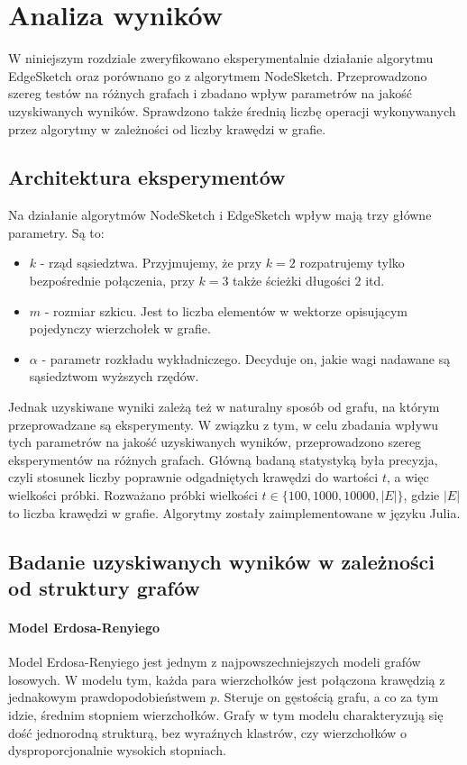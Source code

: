 \chapter{Analiza wyników}

    W niniejszym rozdziale zweryfikowano eksperymentalnie działanie algorytmu EdgeSketch oraz porównano go z algorytmem NodeSketch. Przeprowadzono szereg testów na różnych grafach i zbadano wpływ parametrów na jakość uzyskiwanych wyników. Sprawdzono także średnią liczbę operacji wykonywanych przez algorytmy w zależności od liczby krawędzi w grafie.

\section{Architektura eksperymentów}

    Na działanie algorytmów NodeSketch i EdgeSketch wpływ mają trzy główne parametry. Są to:
    \begin{itemize}
        \item $k$ - rząd sąsiedztwa. Przyjmujemy, że przy $k = 2$ rozpatrujemy tylko bezpośrednie połączenia, przy $k = 3$ także ścieżki długości $2$ itd. 
        \item $m$ - rozmiar szkicu. Jest to liczba elementów w wektorze opisującym pojedynczy wierzchołek w grafie. 
        \item $\alpha$ - parametr rozkładu wykładniczego. Decyduje on, jakie wagi nadawane są sąsiedztwom wyższych rzędów.
    \end{itemize}

    Jednak uzyskiwane wyniki zależą też w naturalny sposób od grafu, na którym przeprowadzane są eksperymenty. W związku z tym, w celu zbadania wpływu tych parametrów na jakość uzyskiwanych wyników, przeprowadzono szereg eksperymentów na różnych grafach. Główną badaną statystyką była precyzja, czyli stosunek liczby poprawnie odgadniętych krawędzi do wartości $t$, a więc wielkości próbki. Rozważano próbki wielkości $t \in \{100, 1000, 10000, |E|\}$, gdzie $|E|$ to liczba krawędzi w grafie. Algorytmy zostały zaimplementowane w języku Julia\cite{Julia}.

\section{Badanie uzyskiwanych wyników w zależności od struktury grafów}

    \subsubsection{Model Erdosa-Renyiego}
        Model Erdosa-Renyiego jest jednym z najpowszechniejszych modeli grafów losowych. W modelu tym, każda para wierzchołków jest połączona krawędzią z jednakowym prawdopodobieństwem $p$. Steruje on gęstością grafu, a co za tym idzie, średnim stopniem wierzchołków. Grafy w tym modelu charakteryzują się dość jednorodną strukturą, bez wyraźnych klastrów, czy wierzchołków o dysproporcjonalnie wysokich stopniach. 


